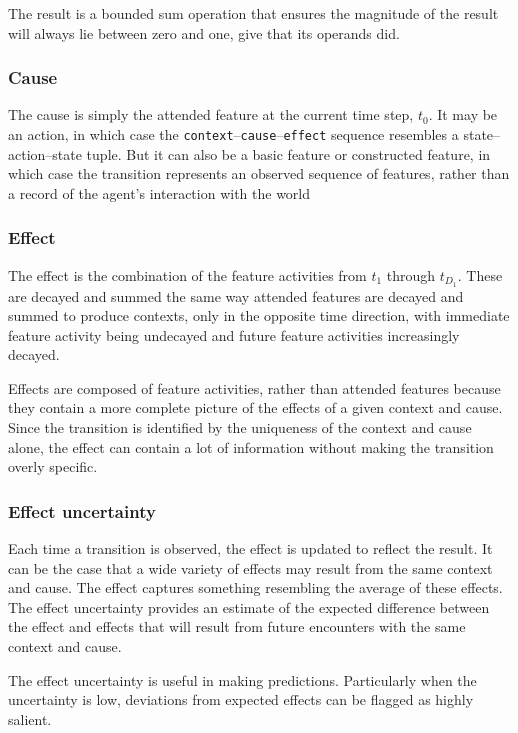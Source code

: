 The result is a bounded sum operation that ensures the magnitude of the result will always lie between zero and one, give that its operands did.


\subsubsection{Cause}
The cause is simply the attended feature at the current time step, $t_0$. It may be an action, in which case the \texttt{context}--\texttt{cause}--\texttt{effect} sequence resembles a state--action--state tuple. But it can also be a basic feature or constructed feature, in which case the transition represents an observed sequence of features, rather than a record of the agent's interaction with the world

\subsubsection{Effect}
The effect is the combination of the feature activities from $t_1$ through $t_{D_1}$. These are decayed and summed the same way attended features are decayed and summed to produce contexts, only in the opposite time direction, with immediate feature activity being undecayed and future feature activities increasingly decayed. 

Effects are composed of feature activities, rather than attended features because they contain a more complete picture of the effects of a given context and cause. Since the transition is identified by the uniqueness of the context and cause alone, the effect can contain a lot of information without making the transition overly specific. 

\subsubsection{Effect uncertainty}
Each time a transition is observed, the effect is updated to reflect the result. It can be the case that a wide variety of effects may result from the same context and cause. The effect captures something resembling the average of these effects. The effect uncertainty provides an estimate of the expected difference between the effect and effects that will result from future encounters with the same context and cause. 

The effect uncertainty is useful in making predictions. Particularly when the uncertainty is low, deviations from expected effects can be flagged as highly salient.


